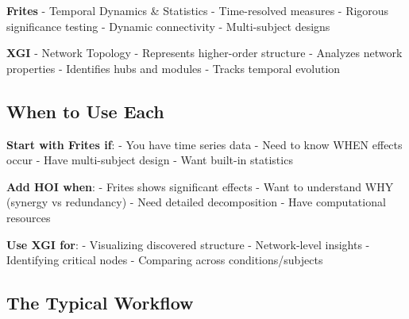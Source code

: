\documentclass[
  11pt,
  letterpaper,
  oneside,
  openany]{book}
\begin{document}
\textbf{Frites} - Temporal Dynamics \& Statistics - Time-resolved
measures - Rigorous significance testing - Dynamic connectivity -
Multi-subject designs

\textbf{XGI} - Network Topology - Represents higher-order structure -
Analyzes network properties - Identifies hubs and modules - Tracks
temporal evolution

\subsection{When to Use Each}\label{when-to-use-each}

\textbf{Start with Frites if}: - You have time series data - Need to
know WHEN effects occur - Have multi-subject design - Want built-in
statistics

\textbf{Add HOI when}: - Frites shows significant effects - Want to
understand WHY (synergy vs redundancy) - Need detailed decomposition -
Have computational resources

\textbf{Use XGI for}: - Visualizing discovered structure - Network-level
insights - Identifying critical nodes - Comparing across
conditions/subjects

\subsection{The Typical Workflow}\label{the-typical-workflow}
\end{document}
